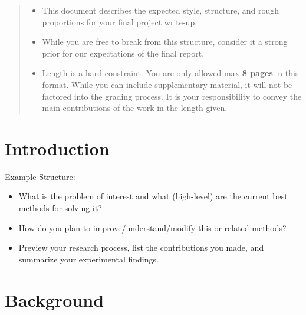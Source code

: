 \documentclass[11pt]{article}
\begin{document}

\begin{abstract}
  \begin{itemize}
  \item This document describes the expected style, structure, and rough proportions for your final project write-up.
  \item While you are free to break from this structure, consider it a strong prior for our expectations of the final report.
\item Length is a hard constraint. You are only allowed max \textbf{8 pages} in this format. While you can include supplementary material, it will not be factored into the grading process. It is your responsibility to convey the main contributions of the work in the length given.
  \end{itemize}



\end{abstract}

\section{Introduction}
\label{sec:introduction}

Example Structure:
\begin{itemize}
\item What is the problem of interest and what (high-level) are the current best methods for solving it?
\item How do you plan to improve/understand/modify this or related methods?
\item Preview your research process, list the contributions you made, and summarize your experimental findings.
\end{itemize}


\section{Background}

\end{document}

